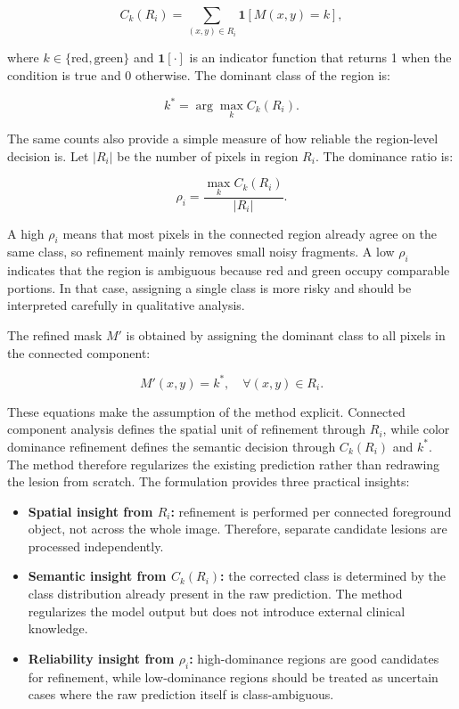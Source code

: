 \begin{equation}
C_k(R_i)=\sum_{(x,y)\in R_i}\mathbf{1}[M(x,y)=k],
\end{equation}

where $k\in\{\text{red},\text{green}\}$ and $\mathbf{1}[\cdot]$ is an indicator function that returns 1 when the condition is true and 0 otherwise. The dominant class of the region is:

\begin{equation}
k^{*}=\arg\max_{k} C_k(R_i).
\end{equation}

The same counts also provide a simple measure of how reliable the region-level decision is. Let $|R_i|$ be the number of pixels in region $R_i$. The dominance ratio is:

\begin{equation}
\rho_i=\frac{\max_k C_k(R_i)}{|R_i|}.
\end{equation}

A high $\rho_i$ means that most pixels in the connected region already agree on the same class, so refinement mainly removes small noisy fragments. A low $\rho_i$ indicates that the region is ambiguous because red and green occupy comparable portions. In that case, assigning a single class is more risky and should be interpreted carefully in qualitative analysis.

The refined mask $M'$ is obtained by assigning the dominant class to all pixels in the connected component:

\begin{equation}
M'(x,y)=k^{*},\quad \forall (x,y)\in R_i.
\end{equation}

These equations make the assumption of the method explicit. Connected component analysis defines the spatial unit of refinement through $R_i$, while color dominance refinement defines the semantic decision through $C_k(R_i)$ and $k^*$. The method therefore regularizes the existing prediction rather than redrawing the lesion from scratch. The formulation provides three practical insights:

\begin{itemize}
    \item \textbf{Spatial insight from $R_i$:} refinement is performed per connected foreground object, not across the whole image. Therefore, separate candidate lesions are processed independently.
    \item \textbf{Semantic insight from $C_k(R_i)$:} the corrected class is determined by the class distribution already present in the raw prediction. The method regularizes the model output but does not introduce external clinical knowledge.
    \item \textbf{Reliability insight from $\rho_i$:} high-dominance regions are good candidates for refinement, while low-dominance regions should be treated as uncertain cases where the raw prediction itself is class-ambiguous.
\end{itemize}


